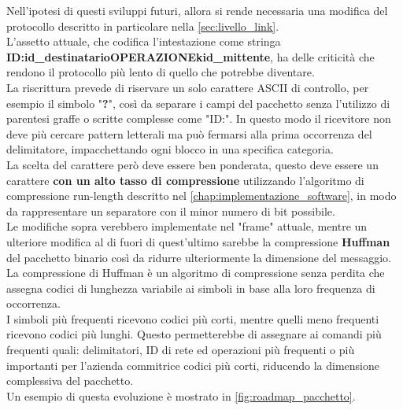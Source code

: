 Nell'ipotesi di questi sviluppi futuri, allora si rende necessaria una modifica del protocollo descritto in particolare nella \autoref{sec:livello_link}.\\ 
L'assetto attuale, che codifica l'intestazione come stringa \\ 
\textbf{ID:id\_destinatario{OPERAZIONE}k{id\_mittente}}, 
ha delle criticità che rendono il protocollo più lento di quello che potrebbe diventare.\\
 La riscrittura prevede di riservare un solo carattere ASCII di controllo, per esempio il simbolo 
 "\textbf{?}", così da separare i campi del pacchetto senza l'utilizzo di parentesi graffe o scritte complesse come "ID:".
  In questo modo il ricevitore non deve più cercare pattern letterali 
 ma può fermarsi alla prima occorrenza del delimitatore, impacchettando ogni blocco in una specifica categoria.\\
 La scelta del carattere però deve essere ben ponderata, questo deve essere un carattere \textbf{con un alto tasso di compressione} utilizzando l'algoritmo 
 di compressione run-length descritto nel \autoref{chap:implementazione_software}, in modo da rappresentare un separatore con il minor numero di bit possibile.\\
 Le modifiche sopra verebbero implementate nel "frame" attuale, mentre un ulteriore modifica al di fuori di quest'ultimo sarebbe la compressione \textbf{Huffman}
    del pacchetto binario così da ridurre ulteriormente la dimensione del messaggio.\\
    La compressione di Huffman è un algoritmo di compressione senza perdita che assegna codici di lunghezza variabile ai simboli in base alla loro frequenza di occorrenza. \\
     I simboli più frequenti ricevono codici più corti, mentre quelli meno frequenti ricevono codici più lunghi.  
     Questo permetterebbe di assegnare ai comandi più frequenti quali: delimitatori, ID di rete ed operazioni più frequenti o più importanti per l'azienda commitrice
        codici più corti, riducendo la dimensione complessiva del pacchetto.\\
        Un esempio di questa evoluzione è mostrato in \autoref{fig:roadmap_pacchetto}.

